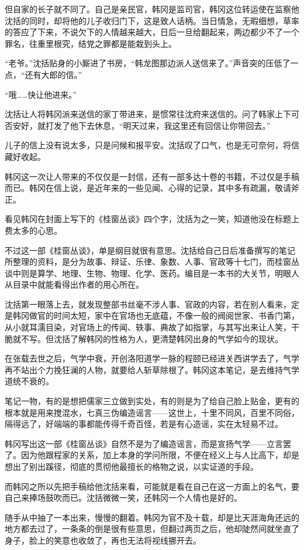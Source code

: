 但自家的长子就不同了。自己是亲民官，韩冈是监司官，韩冈这位转运使在监察他沈括的同时，却将他的儿子收归门下，这是致人话柄。当日情急，无暇细想，草率的答应了下来，不说欠下的人情越来越大，日后一旦给翻起来，两边都少不了一个罪名，往重里根究，结党之罪都是能栽到头上。

“老爷。”沈括贴身的小厮进了书房，“韩龙图那边派人送信来了。”声音突的压低了一点，“还有大郎的信。”

“哦……快让他进来。”

沈括让人将韩冈派来送信的家丁带进来，是惯常往沈府来送信的。问了韩家上下可否安好，就打发了他下去休息，“明天过来，我这里还有回信让你带回去。”

儿子的信上没有说太多，只是问候和报平安。沈括叹了口气，也是无可奈何，将信藏好收起。

韩冈这一次让人带来的不仅仅是一封信，还有一部多达十卷的书籍，不过仅是手稿而已。韩冈在信上说，是近年来的一些见闻、心得的记录，其中多有疏漏，敬请斧正。

看见韩冈在封面上写下的《桂窗丛谈》四个字，沈括为之一笑，知道他没在标题上费太多的心思。

不过这一部《桂窗丛谈》，单是纲目就很有意思。沈括给自己日后准备撰写的笔记所整理的资料，是分为故事、辩证、乐律、象数、人事、官政等十七门，而桂窗丛谈中则是算学、地理、生物、物理、化学、医药。编目是一本书的大关节，明眼人从目录中就能看得出作者的用心所在。

沈括第一眼落上去，就发现整部书丝毫不涉人事、官政的内容，若在别人看来，定是韩冈做官的时间太短，家中在官场也无底蕴，不像一般的阀阅世家、书香门第，从小就耳濡目染，对官场上的传闻、轶事、典故了如指掌，与其写出来让人笑，干脆就不写。但沈括了解韩冈的性格为人，更清楚韩冈出身的气学如今的现状。

在张载去世之后，气学中衰，开创洛阳道学一脉的程颐已经进关西讲学去了，气学再不站出个力挽狂澜的人物，就要给人斩草除根了。韩冈这本笔记，是去维持气学道统不衰的。

笔记一物，有的是想把儒家三立做到实处，有的则是为了给自己脸上贴金，更有的根本就是用来搅混水，七真三伪编造谣言——这世上，十里不同风，百里不同俗，隔得远了，好端端的事都能传得千奇百怪，若是有心造谣，实在太轻易不过。

韩冈写出这一部《桂窗丛谈》自然不是为了编造谣言，而是宣扬气学——立言罢了。因为他跟程家的关系，加上本身的学问所限，不便在经义上与人比高下，却是想出了别出蹊径，彻底的贯彻他最擅长的格物之说，以实证道的手段。

而韩冈之所以先把手稿给他沈括来看，可能就是看在自己在这一方面上的名气，要自己来捧场鼓吹而已。沈括微微一笑，还韩冈一个人情也是好的。

随手从中抽了一本出来，慢慢的翻着。韩冈为官不及十载，却是比天涯海角还远的地方都去过了，一条条的倒是很有些意思，但翻过两页之后，他却陡然间就坐直了身子，脸上的笑意也收敛了，再也无法将视线挪开去。


